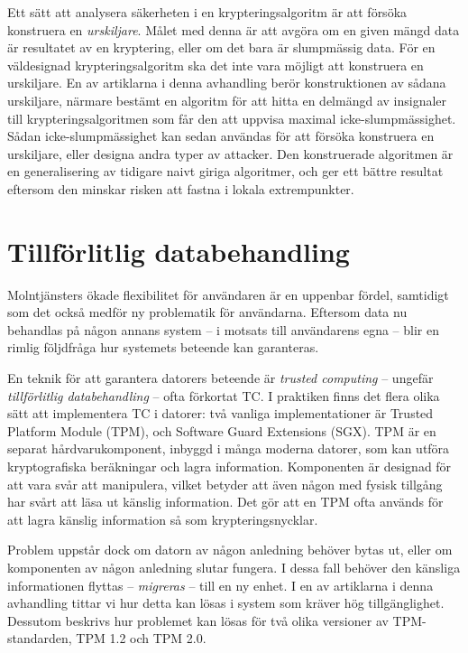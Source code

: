Ett sätt att analysera säkerheten i en krypteringsalgoritm är att försöka konstruera en \emph{urskiljare}.
Målet med denna är att avgöra om en given mängd data är resultatet av en kryptering, eller om det bara är slumpmässig data.
För en väldesignad krypteringsalgoritm ska det inte vara möjligt att konstruera en urskiljare.
En av artiklarna i denna avhandling berör konstruktionen av sådana urskiljare, närmare bestämt en algoritm för att hitta en delmängd av insignaler till krypteringsalgoritmen som får den att uppvisa maximal icke-slumpmässighet.
Sådan icke-slumpmässighet kan sedan användas för att försöka konstruera en urskiljare, eller designa andra typer av attacker.
Den konstruerade algoritmen är en generalisering av tidigare naivt giriga algoritmer, och ger ett bättre resultat eftersom den minskar risken att fastna i lokala extrempunkter.

\section*{Tillförlitlig databehandling}

Molntjänsters ökade flexibilitet för användaren är en uppenbar fördel, samtidigt som det också medför ny problematik för användarna.
Eftersom data nu behandlas på någon annans system -- i motsats till användarens egna -- blir en rimlig följdfråga hur systemets beteende kan garanteras.

En teknik för att garantera datorers beteende är \emph{trusted computing} -- ungefär \emph{tillförlitlig databehandling} -- ofta förkortat TC.
I praktiken finns det flera olika sätt att implementera TC i datorer: två vanliga implementationer är Trusted Platform Module (TPM), och Software Guard Extensions (SGX).
TPM är en separat hårdvarukomponent, inbyggd i många moderna datorer, som kan utföra kryptografiska beräkningar och lagra information.
Komponenten är designad för att vara svår att manipulera, vilket betyder att även någon med fysisk tillgång har svårt att läsa ut känslig information.
Det gör att en TPM ofta används för att lagra känslig information så som krypteringsnycklar.

Problem uppstår dock om datorn av någon anledning behöver bytas ut, eller om komponenten av någon anledning slutar fungera.
I dessa fall behöver den känsliga informationen flyttas -- \emph{migreras} -- till en ny enhet.
I en av artiklarna i denna avhandling tittar vi hur detta kan lösas i system som kräver hög tillgänglighet.
Dessutom beskrivs hur problemet kan lösas för två olika versioner av TPM-standarden, TPM 1.2 och TPM 2.0.

